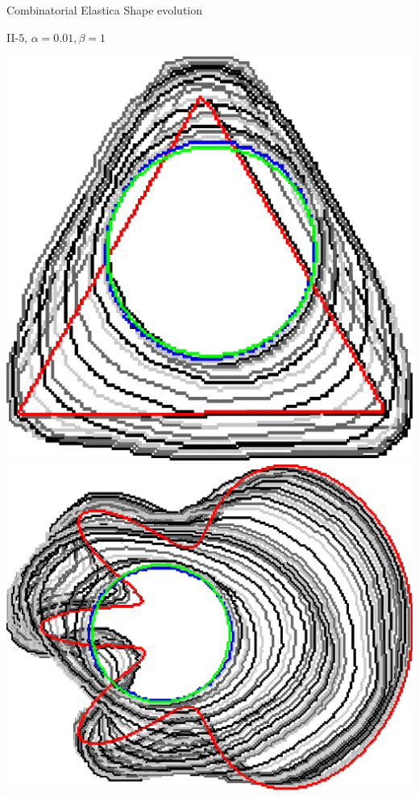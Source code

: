 \begin{frame}
	{Combinatorial Elastica}	
	{Shape evolution}

\begin{center}
II-$5$, $\alpha=0.01, \beta=1$
\end{center}
\begin{minipage}{0.49\textwidth}
\center
\includegraphics[scale=0.15]{figures/combinatorial-elastica/flow/ii/elastica/len_pen_0.01000/jonctions_1/curve_segs_4/best/gs_0.25000/triangle.png}\\[1em]
\includegraphics[scale=0.18]{figures/combinatorial-elastica/flow/ii/elastica/len_pen_0.01000/jonctions_1/curve_segs_4/best/gs_0.25000/flower.png}

\end{minipage}
\end{frame}

